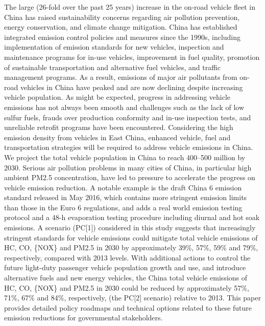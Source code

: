 The large (26-fold over the past 25 years) increase in the on-road vehicle fleet in China has raised sustainability concerns regarding air pollution prevention, energy conservation, and climate change mitigation. China has established integrated emission control policies and measures since the 1990s, including implementation of emission standards for new vehicles, inspection and maintenance programs for in-use vehicles, improvement in fuel quality, promotion of sustainable transportation and alternative fuel vehicles, and traffic management programs. As a result, emissions of major air pollutants from on-road vehicles in China have peaked and are now declining despite increasing vehicle population. As might be expected, progress in addressing vehicle emissions has not always been smooth and challenges such as the lack of low sulfur fuels, frauds over production conformity and in-use inspection tests, and unreliable retrofit programs have been encountered. Considering the high emission density from vehicles in East China, enhanced vehicle, fuel and transportation strategies will be required to address vehicle emissions in China. We project the total vehicle population in China to reach 400–500 million by 2030. Serious air pollution problems in many cities of China, in particular high ambient PM2.5 concentration, have led to pressure to accelerate the progress on vehicle emission reduction. A notable example is the draft China 6 emission standard released in May 2016, which contains more stringent emission limits than those in the Euro 6 regulations, and adds a real world emission testing protocol and a 48-h evaporation testing procedure including diurnal and hot soak emissions. A scenario (PC[1]) considered in this study suggests that increasingly stringent standards for vehicle emissions could mitigate total vehicle emissions of HC, CO, \{NOX\} and PM2.5 in 2030 by approximately 39\%, 57\%, 59\% and 79\%, respectively, compared with 2013 levels. With additional actions to control the future light-duty passenger vehicle population growth and use, and introduce alternative fuels and new energy vehicles, the China total vehicle emissions of HC, CO, \{NOX\} and PM2.5 in 2030 could be reduced by approximately 57\%, 71\%, 67\% and 84\%, respectively, (the PC[2] scenario) relative to 2013. This paper provides detailed policy roadmaps and technical options related to these future emission reductions for governmental stakeholders.